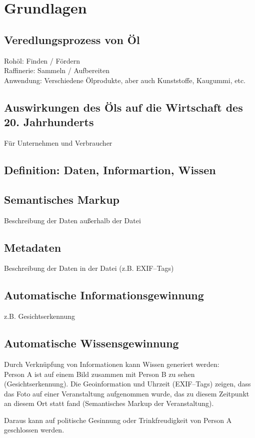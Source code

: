\section{Grundlagen}
\label{sec:grundlagen}

\subsection{Veredlungsprozess von Öl}

Rohöl: Finden / Fördern\\
Raffinerie: Sammeln / Aufbereiten\\
Anwendung: Verschiedene Ölprodukte, aber auch Kunststoffe, Kaugummi, etc.

\subsection{Auswirkungen des Öls auf die Wirtschaft des 20. Jahrhunderts}

Für Unternehmen und Verbraucher

\subsection{Definition: Daten, Informartion, Wissen}

\subsection{Semantisches Markup}

Beschreibung der Daten außerhalb der Datei

\subsection{Metadaten}

Beschreibung der Daten in der Datei (z.B. EXIF--Tags)

\subsection{Automatische Informationsgewinnung}

z.B. Gesichtserkennung

\subsection{Automatische Wissensgewinnung}

Durch Verknüpfung von Informationen kann Wissen generiert werden:\\
Person A ist auf einem Bild zusammen mit Person B zu sehen (Gesichtserkennung). Die Geoinformation und Uhrzeit (EXIF--Tags) zeigen, dass das Foto auf einer Veranstaltung aufgenommen wurde, das zu diesem Zeitpunkt an diesem Ort statt fand (Semantisches Markup der Veranstaltung).

Daraus kann auf politische Gesinnung oder Trinkfreudigkeit von Person A geschlossen werden.